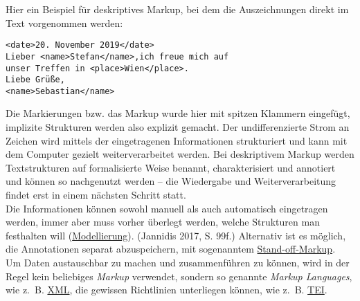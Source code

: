\documentclass{article}
\begin{document}
        Hier ein Beispiel für deskriptives Markup, bei dem die Auszeichnungen direkt im
                  Text vorgenommen werden:\\
            
        \begin{verbatim}<date>20. November 2019</date>
Lieber <name>Stefan</name>,ich freue mich auf 
unser Treffen in <place>Wien</place>.
Liebe Grüße,
<name>Sebastian</name>\end{verbatim}Die Markierungen bzw. das Markup wurde hier mit spitzen Klammern eingefügt,
                  implizite Strukturen werden also explizit gemacht. Der undifferenzierte Strom an
                  Zeichen wird mittels der eingetragenen Informationen strukturiert und kann mit dem
                  Computer gezielt weiterverarbeitet werden. Bei deskriptivem Markup werden
                  Textstrukturen auf formalisierte Weise benannt, charakterisiert und annotiert und
                  können so nachgenutzt werden – die Wiedergabe und Weiterverarbeitung findet erst
                  in einem nächsten Schritt statt.\\
            
        Die Informationen können sowohl manuell als auch automatisch eingetragen werden,
                  immer aber muss vorher überlegt werden, welche Strukturen man festhalten will
                     (\href{http://gams.uni-graz.at/o:konde.137}{Modellierung}).
                     (Jannidis 2017, S. 99f.) Alternativ ist es möglich, die
                  Annotationen separat abzuspeichern, mit sogenanntem 
                  \href{http://gams.uni-graz.at/o:konde.171}{Stand-off-Markup}.\\
            
        Um Daten austauschbar zu machen und zusammenführen zu können, wird in der Regel
                  kein beliebiges \emph{Markup} verwendet, sondern so genannte \emph{Markup Languages}, wie z. B. \href{http://gams.uni-graz.at/o:konde.215}{XML}, die gewissen Richtlinien unterliegen können,
                  wie z. B. \href{http://gams.uni-graz.at/o:konde.178}{TEI}. \\
            
\end{document}
